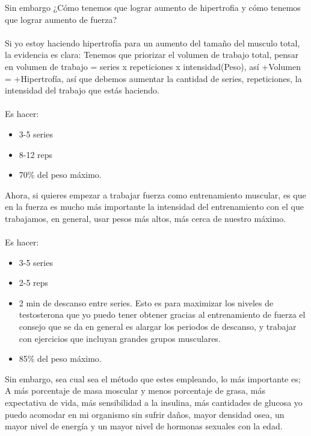 \documentclass{article}
\begin{document}
Sin embargo ¿Cómo tenemos que lograr aumento de hipertrofia y cómo tenemos que lograr aumento de fuerza?\\
\\
Si yo estoy haciendo hipertrofía para un aumento del tamaño del musculo total, la evidencia es clara: Tenemos que priorizar el volumen de trabajo total, pensar en volumen de trabajo = series x repeticiones x intensidad(Peso), así +Volumen = +Hipertrofía, así que debemos aumentar la cantidad de series, repeticiones, la intensidad del trabajo que estás haciendo.
\\
\\
Es hacer:
\begin{itemize}
    \item 3-5 series
    \item 8-12 reps
    \item 70\% del peso máximo.
\end{itemize}
Ahora, si quieres empezar a trabajar fuerza como entrenamiento muscular, es que en la fuerza es mucho más importante la intensidad del entrenamiento con el que trabajamos, en general, usar pesos más altos, más cerca de nuestro máximo.\\
\\
Es hacer:
\begin{itemize}
    \item 3-5 series
    \item 2-5 reps
    \item 2 min de descanso entre series. Esto es para maximizar los niveles de testosterona que yo puedo tener obtener gracias al entrenamiento de fuerza el consejo que se da en general es alargar los periodos de descanso, y trabajar con ejercicios que incluyan grandes grupos musculares.
    \item 85\% del peso máximo.
\end{itemize}
Sin embargo, sea cual sea el método que estes empleando, lo más importante es; A más porcentaje de masa moscular y menos porcentaje de grasa, más expectativa de vida, más sensibilidad a la insulina, más cantidades de glucosa yo puedo acomodar en mi organismo sin sufrir daños, mayor densidad osea, un mayor nivel de energía y un mayor nivel de hormonas sexuales con la edad.
\end{document}

